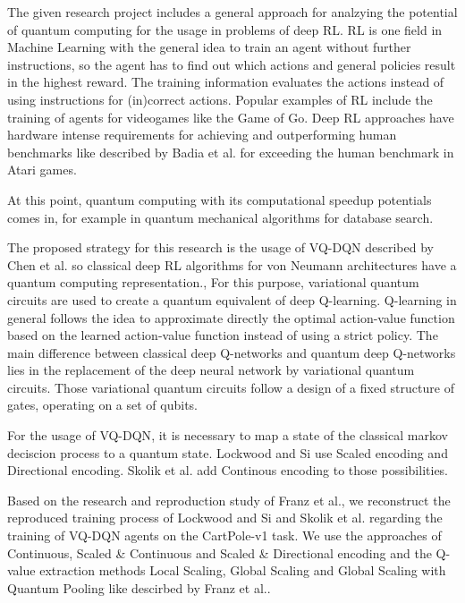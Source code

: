 The given research project includes a general approach for analzying the potential of quantum computing for the usage in problems of deep \ac{RL}. 
\ac{RL} is one field in Machine Learning with the general idea to train an agent without further instructions, so the agent has to find out which actions and general policies result in the highest reward. 
The training information evaluates the actions instead of using instructions for (in)correct actions.
Popular examples of \ac{RL} include the training of agents for videogames like the Game of Go.\autocite{rl}
Deep \ac{RL} approaches have hardware intense requirements for achieving and outperforming human benchmarks like described by Badia et al. for exceeding the human benchmark in Atari games.\autocite{atari}


At this point, quantum computing with its computational speedup potentials comes in, for example in quantum mechanical algorithms for database search\autocite{databasesearch}. 


The proposed strategy for this research is the usage of \ac{VQ-DQN} described by Chen et al. so classical deep \ac{RL} algorithms for von Neumann architectures have a quantum computing representation.\autocite{vqdqn},
For this purpose, variational quantum circuits are used to create a quantum equivalent of deep Q-learning.
Q-learning in general follows the idea to approximate directly the optimal action-value function based on the learned action-value function instead of using a strict policy.\autocite{rl}
The main difference between classical deep Q-networks and quantum deep Q-networks lies in the replacement of the deep neural network by variational quantum circuits.
Those variational quantum circuits follow a design of a fixed structure of gates, operating on a set of qubits.\autocite{circuits}


For the usage of \ac{VQ-DQN}, it is necessary to map a state of the classical markov deciscion process to a quantum state. 
Lockwood and Si use Scaled encoding and Directional encoding.\autocite{lockwood}
Skolik et al. add Continous encoding to those possibilities.\autocite{skolik}


Based on the research and reproduction study of Franz et al.\autocite{instabilities}, we reconstruct the reproduced training process of Lockwood and Si\autocite{lockwood} and Skolik et al.\autocite{skolik} regarding the training of \ac{VQ-DQN} agents on the CartPole-v1 task. 
We use the approaches of Continuous, Scaled \& Continuous and Scaled \& Directional encoding and the Q-value extraction methods Local Scaling, Global Scaling and Global Scaling with Quantum Pooling like descirbed by Franz et al.\autocite{instabilities}.
